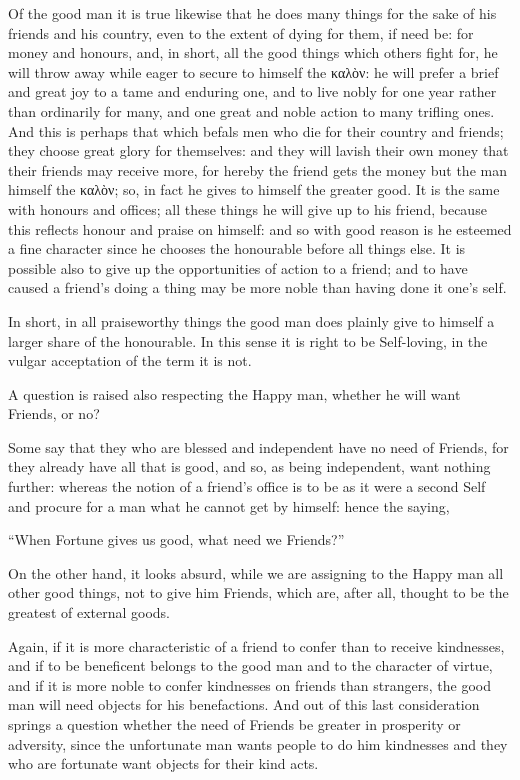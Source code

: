 Of the good man it is true likewise that he does many things for the sake of
his friends and his country, even to the extent of dying for them, if need be:
for money and honours, and, in short, all the good things which others fight
for, he will throw away while eager to secure to himself the
καλὸν: he will prefer a brief and great joy to a tame
and enduring one, and to live nobly for one year rather than ordinarily for
many, and one great and noble action to many trifling ones. And this is perhaps
that which befals men who die for their country and friends; they choose great
glory for themselves: and they will lavish their own money that their friends
may receive more, for hereby the friend gets the money but the man himself the
καλὸν; so, in fact he gives to himself the greater
good. It is the same with honours and offices; all these things he will give up
to his friend, because this reflects honour and praise on himself: and so with
good reason is he esteemed a fine character since he chooses the honourable
before all things else. It is possible also to give up the opportunities of
action to a friend; and to have caused a friend’s doing a thing may be
more noble than having done it one’s self.

In short, in all praiseworthy things the good man does plainly give to himself
a larger share of the honourable. In this sense it is right to be Self-loving,
in the vulgar acceptation of the term it is not.


A question is raised also respecting the Happy man, whether he will want
Friends, or no?

Some say that they who are blessed and independent have no need of Friends, for
they already have all that is good, and so, as being independent, want nothing
further: whereas the notion of a friend’s office is to be as it were a
second Self and procure for a man what he cannot get by himself: hence the
saying,

“When Fortune gives us good, what need we Friends?”

On the other hand, it looks absurd, while we are assigning to the Happy man all
other good things, not to give him Friends, which are, after all, thought to be
the greatest of external goods.

Again, if it is more characteristic of a friend to confer than to receive
kindnesses, and if to be beneficent belongs to the good man and to the
character of virtue, and if it is more noble to confer kindnesses on friends
than strangers, the good man will need objects for his benefactions. And out of
this last consideration springs a question whether the need of Friends be
greater in prosperity or adversity, since the unfortunate man wants people to
do him kindnesses and they who are fortunate want objects for their kind acts.


